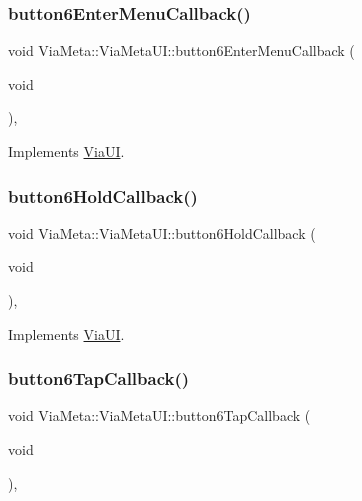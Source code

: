 \subsubsection{\texorpdfstring{button6\+Enter\+Menu\+Callback()}{button6EnterMenuCallback()}}
{\footnotesize\ttfamily void Via\+Meta\+::\+Via\+Meta\+U\+I\+::button6\+Enter\+Menu\+Callback (\begin{DoxyParamCaption}\item[{void}]{ }\end{DoxyParamCaption})\hspace{0.3cm}{\ttfamily [override]}, {\ttfamily [virtual]}}



Implements \mbox{\hyperlink{class_via_u_i_ae59e7ff3a6ba1f641a4a916e47a26513}{Via\+UI}}.

\mbox{\label{class_via_meta_1_1_via_meta_u_i_a793ad6aff954aeefd91a070d1a65c9d1}} 
\subsubsection{\texorpdfstring{button6\+Hold\+Callback()}{button6HoldCallback()}}
{\footnotesize\ttfamily void Via\+Meta\+::\+Via\+Meta\+U\+I\+::button6\+Hold\+Callback (\begin{DoxyParamCaption}\item[{void}]{ }\end{DoxyParamCaption})\hspace{0.3cm}{\ttfamily [override]}, {\ttfamily [virtual]}}



Implements \mbox{\hyperlink{class_via_u_i_afa66f7946b6cf755b94383715b26a651}{Via\+UI}}.

\mbox{\label{class_via_meta_1_1_via_meta_u_i_a8b8724e5d68649da49f3f99203257833}} 
\subsubsection{\texorpdfstring{button6\+Tap\+Callback()}{button6TapCallback()}}
{\footnotesize\ttfamily void Via\+Meta\+::\+Via\+Meta\+U\+I\+::button6\+Tap\+Callback (\begin{DoxyParamCaption}\item[{void}]{ }\end{DoxyParamCaption})\hspace{0.3cm}{\ttfamily [override]}, {\ttfamily [virtual]}}



